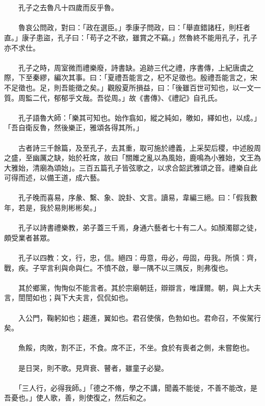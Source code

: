 \\\\
　　孔子之去魯凡十四歲而反乎魯。
\\\\
　　魯哀公問政，對曰：「政在選臣。」季康子問政，曰：「舉直錯諸枉，則枉者直。」康子患盜，孔子曰：「苟子之不欲，雖賞之不竊。」然魯終不能用孔子，孔子亦不求仕。
\\\\
　　孔子之時，周室微而禮樂廢，詩書缺。追跡三代之禮，序書傳，上紀唐虞之際，下至秦繆，編次其事。曰：「夏禮吾能言之，杞不足徵也。殷禮吾能言之，宋不足徵也。足，則吾能徵之矣。」觀殷夏所損益，曰：「後雖百世可知也，以一文一質。周監二代，郁郁乎文哉。吾從周。」故《書傳》、《禮記》自孔氏。
\\\\
　　孔子語魯大師：「樂其可知也。始作翕如，縱之純如，皦如，繹如也，以成。」「吾自衛反魯，然後樂正，雅頌各得其所。」
\\\\
　　古者詩三千餘篇，及至孔子，去其重，取可施於禮義，上采契后稷，中述殷周之盛，至幽厲之缺，始於衽席，故曰「關雎之亂以為風始，鹿鳴為小雅始，文王為大雅始，清廟為頌始」。三百五篇孔子皆弦歌之，以求合韶武雅頌之音。禮樂自此可得而述，以備王道，成六藝。
\\\\
　　孔子晚而喜易，序彖、繫、象、說卦、文言。讀易，韋編三絕。曰：「假我數年，若是，我於易則彬彬矣。」
\\\\
　　孔子以詩書禮樂教，弟子蓋三千焉，身通六藝者七十有二人。如顏濁鄒之徒，頗受業者甚眾。
\\\\
　　孔子以四教：文，行，忠，信。絕四：毋意，毋必，毋固，毋我。所慎：齊，戰，疾。子罕言利與命與仁。不憤不啟，舉一隅不以三隅反，則弗復也。
\\\\
　　其於鄉黨，恂恂似不能言者。其於宗廟朝廷，辯辯言，唯謹爾。朝，與上大夫言，誾誾如也；與下大夫言，侃侃如也。
\\\\
　　入公門，鞠躬如也；趨進，翼如也。君召使儐，色勃如也。君命召，不俟駕行矣。
\\\\
　　魚餒，肉敗，割不正，不食。席不正，不坐。食於有喪者之側，未嘗飽也。
\\\\
　　是日哭，則不歌。見齊衰、瞽者，雖童子必變。
\\\\
　　「三人行，必得我師。」「德之不脩，學之不講，聞義不能徙，不善不能改，是吾憂也。」使人歌，善，則使復之，然后和之。

